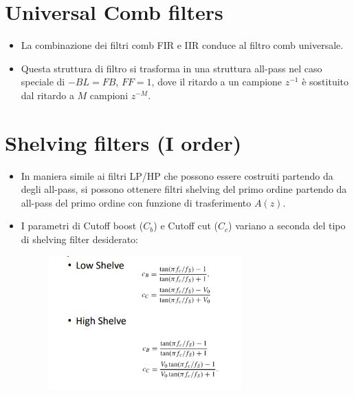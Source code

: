 \section{Universal Comb filters}

\begin{itemize}
    \item La combinazione dei filtri comb FIR e IIR conduce al filtro comb universale.
    
    \item Questa struttura di filtro si trasforma in una struttura all-pass nel caso speciale di $-BL = FB$, $FF = 1$, dove il ritardo a un campione $z^{-1}$ è sostituito dal ritardo a $M$ campioni $z^{-M}$.
\end{itemize}

\section{Shelving filters (I order)}

\begin{itemize}
    \item In maniera simile ai filtri LP/HP che possono essere costruiti partendo da degli all-pass, si possono ottenere filtri shelving del primo ordine partendo da all-pass del primo ordine con funzione di trasferimento $A(z)$.
\end{itemize}

\begin{itemize}
    \item I parametri di Cutoff boost ($C_b$) e Cutoff cut ($C_c$) variano a seconda del tipo di shelving filter desiderato:
    \begin{figure}[H]
        \centering
        \includegraphics[width=0.7\textwidth]{capitoli/capitolo15/immagini/image10.png}
    \end{figure}
\end{itemize}
\vspace{5cm}

